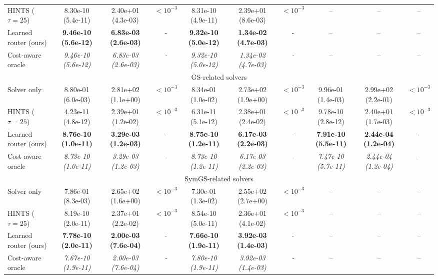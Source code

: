 {\begin{tabular}{lccccccccc}
HINTS ($\tau{=}25$) & 8.30e-10 (5.4e-11) & 2.40e+01 (4.3e-03) & $<10^{-3}$ & 8.31e-10 (4.9e-11) & 2.39e+01 (8.6e-03) & $<10^{-3}$ & -- & -- & -- \\
Learned router (ours) & \textbf{9.46e-10 (5.6e-12)} & \textbf{6.83e-03 (2.6e-03)} & - & \textbf{9.32e-10 (5.0e-12)} & \textbf{1.34e-02 (4.7e-03)} & - & -- & -- & -- \\
Cost-aware oracle & \textit{9.46e-10 (5.6e-12)} & \textit{6.83e-03 (2.6e-03)} & \textit{-} & \textit{9.32e-10 (5.0e-12)} & \textit{1.34e-02 (4.7e-03)} & \textit{-} & -- & -- & -- \\
\midrule
\multicolumn{10}{c}{GS-related solvers} \\ \midrule
Solver only & 8.80e-01 (6.0e-03) & 2.81e+02 (1.1e+00) & $<10^{-3}$ & 8.34e-01 (1.0e-02) & 2.73e+02 (1.9e+00) & $<10^{-3}$ & 9.96e-01 (1.4e-03) & 2.99e+02 (2.2e-01) & $<10^{-3}$ \\
HINTS ($\tau{=}25$) & 4.23e-11 (4.8e-12) & 2.39e+01 (1.2e-02) & $<10^{-3}$ & 6.31e-11 (5.1e-12) & 2.38e+01 (2.4e-02) & $<10^{-3}$ & 9.78e-10 (2.8e-12) & 2.40e+01 (1.7e-03) & $<10^{-3}$ \\
Learned router (ours) & \textbf{8.76e-10 (1.0e-11)} & \textbf{3.29e-03 (1.2e-03)} & - & \textbf{8.75e-10 (1.2e-11)} & \textbf{6.17e-03 (2.2e-03)} & - & \textbf{7.91e-10 (5.5e-11)} & \textbf{2.44e-04 (1.2e-04)} & - \\
Cost-aware oracle & \textit{8.73e-10 (1.0e-11)} & \textit{3.29e-03 (1.2e-03)} & \textit{-} & \textit{8.73e-10 (1.2e-11)} & \textit{6.17e-03 (2.2e-03)} & \textit{-} & \textit{7.47e-10 (5.7e-11)} & \textit{2.44e-04 (1.2e-04)} & \textit{-} \\
\midrule
\multicolumn{10}{c}{SymGS-related solvers} \\ \midrule
Solver only & 7.86e-01 (8.3e-03) & 2.65e+02 (1.6e+00) & $<10^{-3}$ & 7.30e-01 (1.3e-02) & 2.55e+02 (2.7e+00) & $<10^{-3}$ & -- & -- & -- \\
HINTS ($\tau{=}25$) & 8.19e-10 (2.0e-11) & 2.37e+01 (2.2e-02) & $<10^{-3}$ & 8.54e-10 (5.0e-11) & 2.36e+01 (4.1e-02) & $<10^{-3}$ & -- & -- & -- \\
Learned router (ours) & \textbf{7.78e-10 (2.0e-11)} & \textbf{2.00e-03 (7.6e-04)} & - & \textbf{7.66e-10 (1.9e-11)} & \textbf{3.92e-03 (1.4e-03)} & - & -- & -- & -- \\
Cost-aware oracle & \textit{7.67e-10 (1.9e-11)} & \textit{2.00e-03 (7.6e-04)} & \textit{-} & \textit{7.80e-10 (1.9e-11)} & \textit{3.92e-03 (1.4e-03)} & \textit{-} & -- & -- & -- \\

\end{tabular}}

